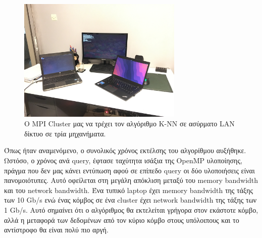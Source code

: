 \documentclass[11pt]{scrartcl} %
\begin{document}
\begin{figure}
    \begin{center}
        \includegraphics[width=0.7\textwidth]{assets/mpi_cluster.png}
    \end{center}
    \caption{Ο MPI Cluster μας να τρέχει τον αλγόριθμο K-NN σε ασύρματο LAN δίκτυο σε τρία μηχανήματα.}
    \label{fig:}
\end{figure}

Όπως ήταν αναμενόμενο, ο συνολικός χρόνος εκτέλσης του αλγορίθμου αυξήθηκε.
Ωστόσο, ο χρόνος ανά query, έφτασε ταχύτητα ισάξια της OpenMP υλοποίησης, πράγμα που δεν μας κάνει εντύπωση αφού σε επίπεδο query οι δύο υλοποιήσεις είναι πανομοιότυπες.
Αυτό οφείλεται στη μεγάλη απόκλιση μεταξύ του memory bandwidth και του network bandwidth.
Ένα τυπικό laptop έχει memory bandwidth της τάξης των 10 Gb/s ενώ ένας κόμβος σε ένα cluster έχει network bandwidth της τάξης των 1 Gb/s.
Αυτό σημαίνει ότι ο αλγόριθμος θα εκτελείται γρήγορα στον εκάστοτε κόμβο, αλλά η μεταφορά των δεδομένων από τον κύριο κόμβο στους υπόλοιπους και το αντίστροφο θα είναι πολύ πιο αργή.


\end{document}
